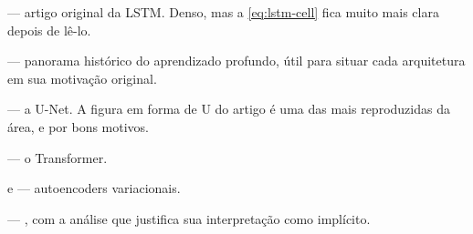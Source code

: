 \begin{leituras}
\item \citet{Hochreiter1997} --- artigo original da LSTM. Denso, mas a
      \cref{eq:lstm-cell} fica muito mais clara depois de lê-lo.
\item \citet{SCHMIDHUBER201585} --- panorama histórico do aprendizado profundo, útil
      para situar cada arquitetura em sua motivação original.
\item \citet{Ronneberger2015} --- a U-Net. A figura em forma de U do artigo é uma das
      mais reproduzidas da área, e por bons motivos.
\item \citet{Vaswani2017} --- o Transformer.
\item \citet{Kingma2014} e \citet{VAE} --- autoencoders variacionais.
\item \citet{srivastava14a} --- , com a análise que justifica sua
      interpretação como  implícito.
\end{leituras}
